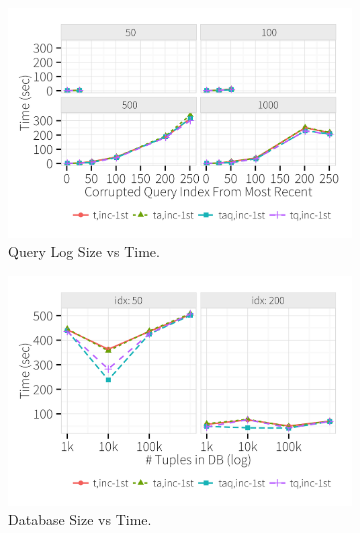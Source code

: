   \begin{figure}[h]
    \centering
    \begin{subfigure}[t]{.3\textwidth}
      \includegraphics[width = \columnwidth]{figures/logsize_time}
      \vspace*{-.1in}
      \caption{Query Log Size vs Time.}
      \label{f:scale1} 
    \end{subfigure}
    \begin{subfigure}[t]{.3\textwidth}
      \includegraphics[width = \columnwidth]{figures/dbsize_time}
      \vspace*{-.1in}
      \caption{Database Size vs Time.}
      \label{f:scale2} 
    \end{subfigure}
    \begin{subfigure}[t]{.3\textwidth}

\end{subfigure}
\end{figure}
